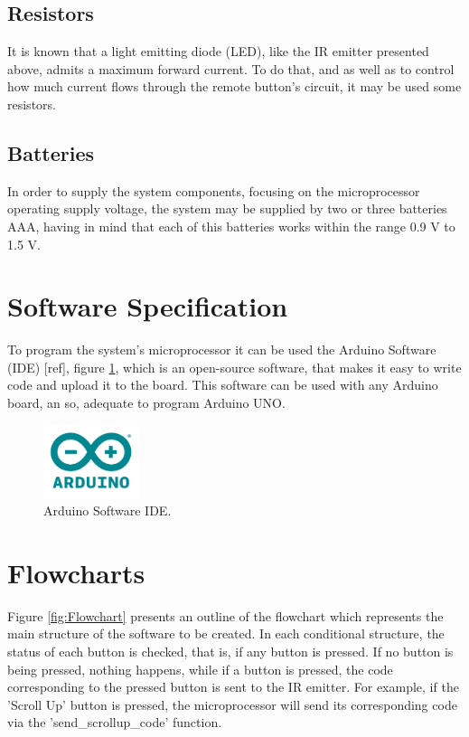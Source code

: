 \documentclass[12pt, letterpaper]{report}
\begin{document}
\subsection{Resistors}
It is known that a light emitting diode (LED), like the IR emitter presented above, admits a maximum forward current. To do that, and as well as to control how much current flows through the remote button’s circuit, it may be used some resistors.

\subsection{Batteries}
In order to supply the system components, focusing on the microprocessor operating supply voltage, the system may be supplied by two or three batteries AAA, having in mind that each of this batteries works within the range 0.9 V to 1.5 V.

\section{Software Specification}
To program the system’s microprocessor it can be used the Arduino Software (IDE) [ref], figure \ref{fig:arduino}, which is an open-source software, that makes it easy to write code and upload it to the board. This software can be used with any Arduino board, an so, adequate to program Arduino UNO.

\begin{figure}[ht]
	\centering
	\includegraphics[width=0.25\textwidth]{arduino}
	\caption{Arduino Software IDE.}
	\label{fig:arduino}
\end{figure}

\section{Flowcharts}
Figure \ref{fig:Flowchart} presents an outline of the flowchart which represents the main structure of the software to be created. In each conditional structure, the status of each button is checked, that is, if any button is pressed. If no button is being pressed, nothing happens, while if a button is pressed, the code corresponding to the pressed button is sent to the IR emitter. For example, if the 'Scroll Up' button is pressed, the microprocessor will send its corresponding code via the 'send\_scrollup\_code' function.
\end{document}
